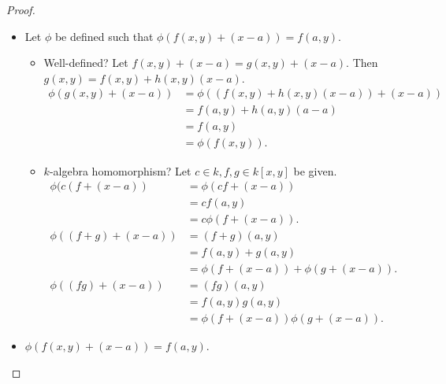 \documentclass[12pt, psamsfonts]{amsart}
\theoremstyle{definition}
\theoremstyle{remark}
\numberwithin{equation}{section}
\begin{document}
\begin{proof}
  $ $
  \begin{itemize}
    \item
      Let $\phi$ be defined such that $\phi(f(x, y) + (x - a)) = f(a, y)$.
      \begin{itemize}
        \item
          Well-defined?
          Let $f(x, y) + (x - a) = g(x, y) + (x - a)$.
          Then $g(x, y) = f(x, y) + h(x, y)(x - a)$.
          \begin{align*}
            \phi(g(x, y) + (x - a))
              &= \phi((f(x, y) + h(x, y)(x - a)) + (x - a)) \\
              &= f(a, y) + h(a, y)(a - a) \\
              &= f(a, y) \\
              &= \phi(f(x, y)).
          \end{align*}
        \item
          $k$-algebra homomorphism?
          Let $c \in k, f, g \in k[x, y]$ be given.
          \begin{align*}
            \phi(c(f + (x - a))
              &= \phi(cf + (x - a)) \\
              &= cf(a, y) \\
              &= c\phi(f + (x - a)). \\
            \phi((f + g) + (x - a))
              &= (f + g)(a, y) \\
              &= f(a, y) + g(a, y) \\
              &= \phi(f + (x - a)) + \phi(g + (x - a)). \\
            \phi((fg) + (x - a))
              &= (fg)(a, y) \\
              &= f(a, y)g(a, y) \\
              &= \phi(f + (x - a))\phi(g + (x - a)).
          \end{align*}
      \end{itemize}
    \item
      $\phi(f(x, y) + (x - a)) = f(a, y)$.
  \end{itemize}
\end{proof}
\end{document}
